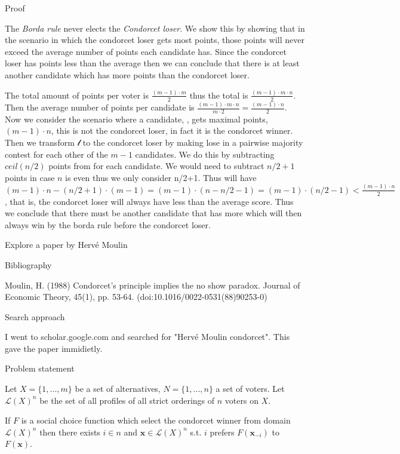 \documentclass[12pt]{article}
\newenvironment{question}[2][Question]{\begin{trivlist}
\item[\hskip \labelsep {\bfseries #1}\hskip \labelsep {\bfseries #2.}]}{\end{trivlist}}
\newenvironment{answer}[2][Answer]{\begin{trivlist}
\item[\hskip \labelsep {\bfseries #1}\hskip \labelsep {\bfseries #2:}]}{\end{trivlist}}
\begin{document}
\begin{answer}{b)}{Proof}

The \textit{Borda rule} never elects the \textit{Condorcet loser}. We show this by showing that in the scenario in which the condorcet loser gets most points, those points will never exceed the average number of points each candidate has. Since the condorcet loser has points less than the average then we can conclude that there is at least another candidate which has more points than the condorcet loser.

The total amount of points per voter is $\frac{(m-1)\cdot m}{2}$ thus the total is $\frac{(m-1)\cdot m\cdot n}{2}$. Then the average number of points per candidate is $\frac{(m-1)\cdot m\cdot n}{m\cdot 2}=\frac{(m-1)\cdot n}{2}$. Now we consider the scenario where a candidate, , gets maximal points, $(m-1) \cdot n$, this is not the condorcet loser, in fact it is the condorcet winner. Then we transform $\mathcal{l}$ to the condorcet loser by making  lose in a pairwise majority contest for each other of the $m-1$ candidates. We do this by subtracting $ceil(n/2)$ points from  for each candidate. We would need to subtract $n/2+1$ points in case $n$ is even thus we only consider n/2+1. Thus  will have $(m-1) \cdot n - (n/2+1)\cdot (m-1)=(m-1)\cdot (n-n/2-1)=(m-1)\cdot (n/2-1)<\frac{(m-1)\cdot n}{2}$, that is, the condorcet loser will always have less than the average score. Thus we conclude that there must be another candidate that has more which will then always win by the borda rule before the condorcet loser.
\end{answer}

\begin{question}{2}

Explore a paper by Hervé Moulin
\end{question}
\begin{answer}{a)}{Bibliography}

Moulin, H. (1988) Condorcet's principle implies the no show paradox. Journal of Economic Theory, 45(1), pp. 53-64. (doi:10.1016/0022-0531(88)90253-0)
\end{answer}

\begin{answer}{b)}{Search approach}

I went to scholar.google.com and searched for "Hervé Moulin condorcet". This gave the paper immidietly.
\end{answer}

\begin{answer}{c)}{Problem statement}

Let $X=\{1, ..., m \}$ be a set of alternatives, $N=\{1, ..., n \}$ a set of voters. Let $\mathcal{L}(X)^n$ be the set of all profiles of all strict orderings of $n$ voters on $X$.

If $F$ is a social choice function which select the condorcet winner from domain $\mathcal{L}(X)^n$ then there exists $i \in n$ and $\boldsymbol{x} \in \mathcal{L}(X)^n$ s.t. $i$ prefers $F(\boldsymbol{x}_{-i})$ to $F(\boldsymbol{x})$.
\end{answer}
\end{document}
